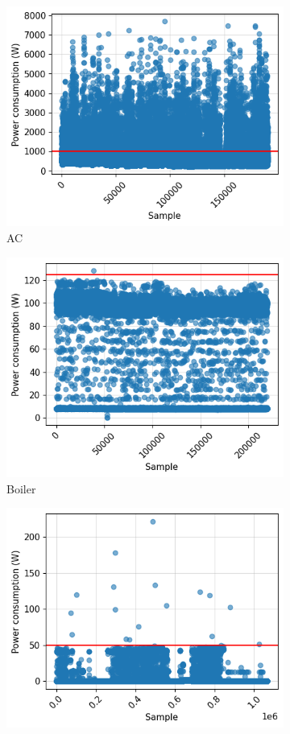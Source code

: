 \begin{figure}
  \begin{subfigure}{.5\textwidth}
    \centering
    \includegraphics[width=.9\linewidth]{images/raw_consumptions/ac.png}
    \caption{AC}%
    \label{fig:ac}
  \end{subfigure}%
  \begin{subfigure}{.5\textwidth}
    \centering
    \includegraphics[width=.9\linewidth]{images/raw_consumptions/boiler.png}
    \caption{Boiler}%
    \label{fig:boiler}
  \end{subfigure}
  \begin{subfigure}{\textwidth}
    \centering
    \includegraphics[width=.42\linewidth]{images/raw_consumptions/lamp.png}

\end{subfigure}
\end{figure}
